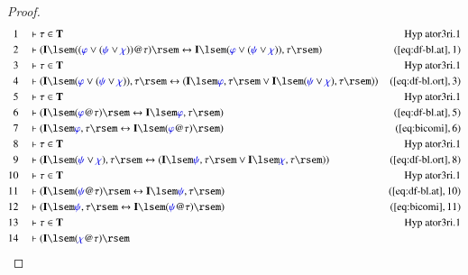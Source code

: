 \begin{proof}
\begin{align}
  1 &&  & \vdash \tau \in
      \mathbf{T}&\text{Hyp~ator3ri.1}\notag
  \\ 2 &&  & \vdash ( \mathbf{I} \lsem ( ( \mw{\varphi} \vee (
      \mw{\psi} \vee \mw{\chi} ) ) @ \tau ) \rsem \leftrightarrow
      \mathbf{I} \lsem ( \mw{\varphi} \vee ( \mw{\psi} \vee \mw{\chi} )
      ) , \tau \rsem )&(\mbox{\ref{eq:df-bl.at}},1)\notag
  \\ 3 &&  & \vdash \tau \in
      \mathbf{T}&\text{Hyp~ator3ri.1}\notag
  \\ 4 &&  & \vdash ( \mathbf{I} \lsem ( \mw{\varphi} \vee ( \mw{\psi}
      \vee \mw{\chi} ) ) , \tau \rsem \leftrightarrow ( \mathbf{I}
      \lsem \mw{\varphi} , \tau \rsem \vee \mathbf{I} \lsem ( \mw{\psi}
      \vee \mw{\chi} ) , \tau \rsem )
      )&(\mbox{\ref{eq:df-bl.ort}},3)\notag
  \\ 5 &&  & \vdash \tau \in
      \mathbf{T}&\text{Hyp~ator3ri.1}\notag
  \\ 6 &&  & \vdash ( \mathbf{I} \lsem ( \mw{\varphi} @ \tau ) \rsem
      \leftrightarrow \mathbf{I} \lsem \mw{\varphi} , \tau \rsem
      )&(\mbox{\ref{eq:df-bl.at}},5)\notag
  \\ 7 &&  & \vdash ( \mathbf{I} \lsem \mw{\varphi} , \tau \rsem
      \leftrightarrow \mathbf{I} \lsem ( \mw{\varphi} @ \tau ) \rsem
      )&(\mbox{\ref{eq:bicomi}},6)\notag
  \\ 8 &&  & \vdash \tau \in
      \mathbf{T}&\text{Hyp~ator3ri.1}\notag
  \\ 9 &&  & \vdash ( \mathbf{I} \lsem ( \mw{\psi} \vee \mw{\chi} ) ,
      \tau \rsem \leftrightarrow ( \mathbf{I} \lsem \mw{\psi} , \tau
      \rsem \vee \mathbf{I} \lsem \mw{\chi} , \tau \rsem )
      )&(\mbox{\ref{eq:df-bl.ort}},8)\notag
  \\ 10 &&  & \vdash \tau \in
      \mathbf{T}&\text{Hyp~ator3ri.1}\notag
  \\ 11 &&  & \vdash ( \mathbf{I} \lsem ( \mw{\psi} @ \tau ) \rsem
      \leftrightarrow \mathbf{I} \lsem \mw{\psi} , \tau \rsem
      )&(\mbox{\ref{eq:df-bl.at}},10)\notag
  \\ 12 &&  & \vdash ( \mathbf{I} \lsem \mw{\psi} , \tau \rsem
      \leftrightarrow \mathbf{I} \lsem ( \mw{\psi} @ \tau ) \rsem
      )&(\mbox{\ref{eq:bicomi}},11)\notag
  \\ 13 &&  & \vdash \tau \in
      \mathbf{T}&\text{Hyp~ator3ri.1}\notag
  \\ 14 &&  & \vdash ( \mathbf{I} \lsem ( \mw{\chi} @ \tau ) \rsem

\end{align}
\end{proof}
